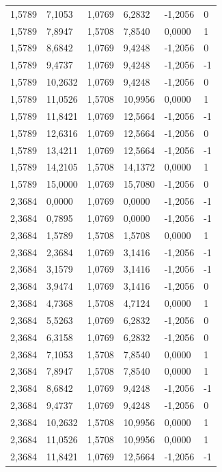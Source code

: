 \documentclass[12pt]{article}
\begin{document}
\begin{longtable}{@{}llllll@{}}
		1,5789  & 7,1053  & 1,0769  & 6,2832  & -1,2056  & 0  \\
		1,5789  & 7,8947  & 1,5708  & 7,8540  & 0,0000   & 1  \\
		1,5789  & 8,6842  & 1,0769  & 9,4248  & -1,2056  & 0  \\
		1,5789  & 9,4737  & 1,0769  & 9,4248  & -1,2056  & -1 \\
		1,5789  & 10,2632 & 1,0769  & 9,4248  & -1,2056  & 0  \\
		1,5789  & 11,0526 & 1,5708  & 10,9956 & 0,0000   & 1  \\
		1,5789  & 11,8421 & 1,0769  & 12,5664 & -1,2056  & -1 \\
		1,5789  & 12,6316 & 1,0769  & 12,5664 & -1,2056  & 0  \\
		1,5789  & 13,4211 & 1,0769  & 12,5664 & -1,2056  & -1 \\
		1,5789  & 14,2105 & 1,5708  & 14,1372 & 0,0000   & 1  \\
		1,5789  & 15,0000 & 1,0769  & 15,7080 & -1,2056  & 0  \\
		2,3684  & 0,0000  & 1,0769  & 0,0000  & -1,2056  & -1 \\
		2,3684  & 0,7895  & 1,0769  & 0,0000  & -1,2056  & -1 \\
		2,3684  & 1,5789  & 1,5708  & 1,5708  & 0,0000   & 1  \\
		2,3684  & 2,3684  & 1,0769  & 3,1416  & -1,2056  & -1 \\
		2,3684  & 3,1579  & 1,0769  & 3,1416  & -1,2056  & -1 \\
		2,3684  & 3,9474  & 1,0769  & 3,1416  & -1,2056  & 0  \\
		2,3684  & 4,7368  & 1,5708  & 4,7124  & 0,0000   & 1  \\
		2,3684  & 5,5263  & 1,0769  & 6,2832  & -1,2056  & 0  \\
		2,3684  & 6,3158  & 1,0769  & 6,2832  & -1,2056  & 0  \\
		2,3684  & 7,1053  & 1,5708  & 7,8540  & 0,0000   & 1  \\
		2,3684  & 7,8947  & 1,5708  & 7,8540  & 0,0000   & 1  \\
		2,3684  & 8,6842  & 1,0769  & 9,4248  & -1,2056  & -1 \\
		2,3684  & 9,4737  & 1,0769  & 9,4248  & -1,2056  & 0  \\
		2,3684  & 10,2632 & 1,5708  & 10,9956 & 0,0000   & 1  \\
		2,3684  & 11,0526 & 1,5708  & 10,9956 & 0,0000   & 1  \\
		2,3684  & 11,8421 & 1,0769  & 12,5664 & -1,2056  & -1 \\

\end{longtable}
\end{document}
